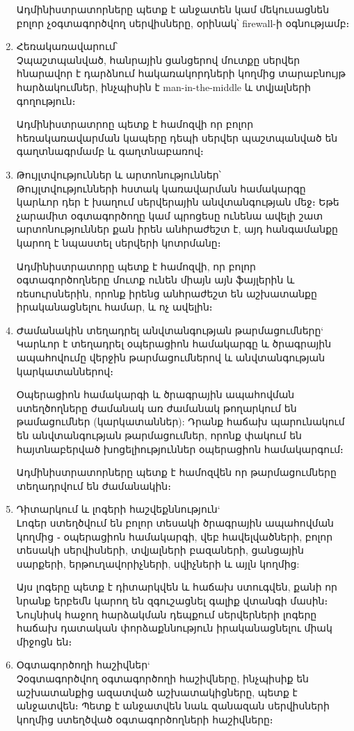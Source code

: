 \documentclass[a4paper,12pt]{article}
\begin{document}
\begin{sloppypar}
\begin{enumerate}
    Ադմինիստրատորները պետք է անջատեն կամ մեկուսացնեն բոլոր չօգտագործվող
    սերվիսները, օրինակ՝ firewall-ի օգնությամբ։
\item Հեռակառավարում՝\\
    Չպաշտպանված, հանրային ցանցերով մուտքը սերվեր հնարավոր է դարձնում
    հակառակորդների կողմից տարաբնույթ հարձակումներ, ինչպիսին է
    man-in-the-middle և տվյալների գողություն։

    Ադմինիստրատրոը պետք է համոզվի որ բոլոր հեռակառավարման կապերը
    դեպի սերվեր պաշտպանված են գաղտնագրմամբ և գաղտնաբառով։
\item Թույլտվություններ և արտոնություններ՝\\
    Թույլտվությունների հստակ կառավարման համակարգը կարևոր դեր է խաղում
    սերվերային անվտանգության մեջ։ Եթե չարամիտ օգտագործողը կամ պրոցեսը
    ունենա ավելի շատ արտոնություններ քան իրեն անհրաժեշտ է, այդ հանգամանքը
    կարող է նպաստել սերվերի կոտրմանը։

    Ադմինիստրատորը պետք է համոզվի, որ բոլոր օգտագործողները մուտք ունեն
    միայն այն ֆայլերին և ռեսուրսներին, որոնք իրենց անհրաժեշտ են
    աշխատանքը իրականացնելու համար, և ոչ ավելին։
\item Ժամանակին տեղադրել անվտանգության թարմացումները`\\
    Կարևոր է տեղադրել օպերացիոն համակարգը և ծրագրային ապահովումը
    վերջին թարմացումներով և անվտանգության կարկատաններով։

	Օպերացիոն համակարգի և ծրագրային ապահովման ստեղծողները ժամանակ
	առ ժամանակ թողարկում են թամացումներ (կարկատաններ):
	Դրանք հաճախ պարունակում են անվտանգության թարմացումներ, որոնք
	փակում են հայտնաբերված խոցելիություններ օպերացիոն համակարգում։

    Ադմինիստրատորները պետք է համոզվեն որ թարմացումները տեղադրվում են
    ժամանակին։
\item Դիտարկում և լոգերի հաշվեքննություն`\\
    Լոգեր ստեղծվում են բոլոր տեսակի ծրագրային ապահովման կողմից ֊
    օպերացիոն համակարգի, վեբ հավելվածների, բոլոր տեսակի սերվիսների,
    տվյալների բազաների, ցանցային սարքերի, երթուղավորիչների, սվիչների
	և այլն կողմից:

    Այս լոգերը պետք է դիտարկվեն և հաճախ ստուգվեն, քանի որ նրանք երբեմն
    կարող են զգուշացնել գալիք վտանգի մասին։ Նույնիսկ հաջող հարձակման
    դեպքում սերվերների լոգերը հաճախ դատական փորձաքննություն
    իրականացնելու միակ միջոցն են։
\item Օգտագործողի հաշիվներ`\\
    Չօգտագործվող օգտագործողի հաշիվները, ինչպիսիք են աշխատանքից ազատված
    աշխատակիցները, պետք է անջատվեն։ Պետք է անջատվեն նաև զանազան
    սերվիսների կողմից ստեղծված օգտագործողների հաշիվները։


\end{enumerate}
\end{sloppypar}
\end{document}
